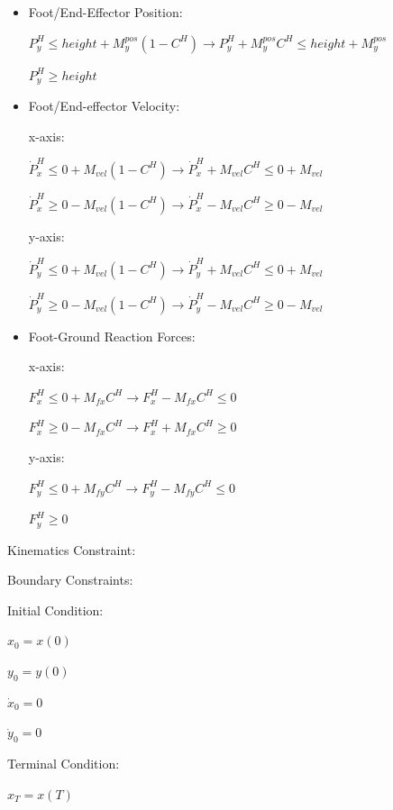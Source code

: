 \documentclass[a4paper,10pt]{article}
\begin{document}
\begin{itemize}
	\item Foot/End-Effector Position:
	
	$P^H_y \leq height + M^{pos}_y(1-C^H) \rightarrow P^H_y +  M^{pos}_yC^H \leq height + M^{pos}_y$
	
	$P^H_y \geq height$
	
	\item Foot/End-effector Velocity:
	
	x-axis:
	
	$\dot{P}^H_x \leq 0 + M_{vel}(1-C^H) \rightarrow \dot{P}^H_x + M_{vel}C^H \leq 0 + M_{vel}$
	
	$\dot{P}^H_x \geq 0 - M_{vel}(1-C^H) \rightarrow \dot{P}^H_x - M_{vel}C^H \geq 0 - M_{vel}$
	
	y-axis:
	
	$\dot{P}^H_y \leq 0 + M_{vel}(1-C^H) \rightarrow \dot{P}^H_y + M_{vel}C^H \leq 0 + M_{vel}$
	
	$\dot{P}^H_y \geq 0 - M_{vel}(1-C^H) \rightarrow \dot{P}^H_y - M_{vel}C^H \geq 0 - M_{vel}$
	
	\item Foot-Ground Reaction Forces:
	
	x-axis:
	
	$F^H_x \leq 0 + M_{fx}C^H \rightarrow F^H_x - M_{fx}C^H \leq 0$
	
	$F^H_x \geq 0 - M_{fx}C^H \rightarrow F^H_x + M_{fx}C^H \geq 0$
	
	y-axis:
	
	$F^H_y \leq 0 + M_{fy}C^H \rightarrow F^H_y - M_{fy}C^H \leq 0$
	
	$F^H_y \geq 0$
	
\end{itemize}

\vspace{3mm}

Kinematics Constraint:

\vspace{3mm}

Boundary Constraints:

Initial Condition: 

$x_0 = x(0)$

$y_0 = y(0)$

$\dot{x}_0 = 0$

$\dot{y}_0 = 0$

\vspace{2mm}

Terminal Condition:

$x_T = x(T)$
\end{document}
